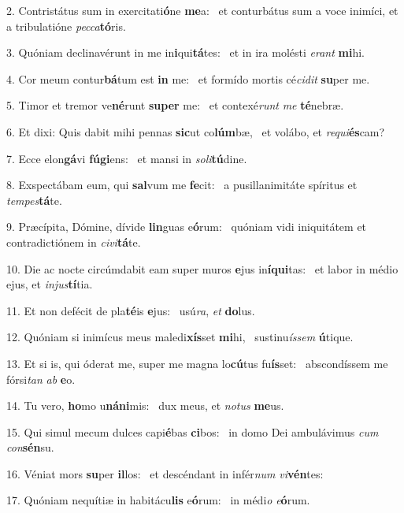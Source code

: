 2. Contristátus sum in exercitati\textbf{ó}ne \textbf{me}a: \ast\  et conturbátus sum a voce inimíci, et a tribulatióne \textit{pec}\textit{ca}\textbf{tó}ris.\

3. Quóniam declinavérunt in me in\textbf{i}qui\textbf{tá}tes: \ast\  et in ira molésti \textit{e}\textit{rant} \textbf{mi}hi.\

4. Cor meum contur\textbf{bá}tum est \textbf{in} me: \ast\  et formído mortis cé\textit{ci}\textit{dit} \textbf{su}per me.\

5. Timor et tremor ve\textbf{né}runt \textbf{su}\textbf{per} me: \ast\  et contexé\textit{runt} \textit{me} \textbf{té}nebræ.\

6. Et dixi: Quis dabit mihi pennas \textbf{sic}ut co\textbf{lúm}bæ, \ast\  et volábo, et \textit{re}\textit{qui}\textbf{és}cam?\

7. Ecce elon\textbf{gá}vi \textbf{fú}\textbf{gi}ens: \ast\  et mansi in \textit{so}\textit{li}\textbf{tú}dine.\

8. Exspectábam eum, qui \textbf{sal}vum me \textbf{fe}cit: \ast\  a pusillanimitáte spíritus et \textit{tem}\textit{pes}\textbf{tá}te.\

9. Præcípita, Dómine, dívide \textbf{lin}guas e\textbf{ó}rum: \ast\  quóniam vidi iniquitátem et contradictiónem in \textit{ci}\textit{vi}\textbf{tá}te.\

10. Die ac nocte circúmdabit eam super muros \textbf{e}jus in\textbf{í}\textbf{qui}tas: \ast\  et labor in médio ejus, et \textit{in}\textit{jus}\textbf{tí}tia.\

11. Et non defécit de pla\textbf{té}is \textbf{e}jus: \ast\  usú\textit{ra}, \textit{et} \textbf{do}lus.\

12. Quóniam si inimícus meus maledi\textbf{xís}set \textbf{mi}hi, \ast\  sustinu\textit{ís}\textit{sem} \textbf{ú}tique.\

13. Et si is, qui óderat me, super me magna lo\textbf{cú}tus fu\textbf{ís}set: \ast\  abscondíssem me fórsi\textit{tan} \textit{ab} \textbf{e}o.\

14. Tu vero, \textbf{ho}mo u\textbf{ná}\textbf{ni}mis: \ast\  dux meus, et \textit{no}\textit{tus} \textbf{me}us.\

15. Qui simul mecum dulces capi\textbf{é}bas \textbf{ci}bos: \ast\  in domo Dei ambulávimus \textit{cum} \textit{con}\textbf{sén}su.\

16. Véniat mors \textbf{su}per \textbf{il}los: \ast\  et descéndant in infér\textit{num} \textit{vi}\textbf{vén}tes:\

17. Quóniam nequítiæ in habitácu\textbf{lis} e\textbf{ó}rum: \ast\  in médi\textit{o} \textit{e}\textbf{ó}rum.\

